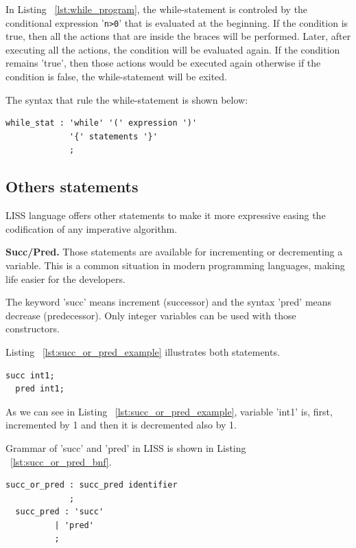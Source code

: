 \documentclass[
  oneside,
  11pt, a4paper,
  footinclude=true,
  headinclude=true,
  cleardoublepage=empty
]{scrbook}
\begin{document}
In Listing ~\ref{lst:while_program}, the while-statement is controled by the conditional expression '\verb+n>0+' that is evaluated at the beginning. If the condition is true, then all the actions that are inside the braces will be performed. Later, after executing all the actions, the condition will be evaluated again. If the condition remains 'true', then those actions would be executed again otherwise if the condition is false, the while-statement will be exited.

The syntax that rule the while-statement is shown below:

\begin{lstlisting}[caption={CFG for while-statement in LISS}]
  while_stat : 'while' '(' expression ')'
             '{' statements '}'
             ;
\end{lstlisting}



\subsection{Others statements}

LISS language offers other statements to make it more expressive easing the codification of any imperative algorithm.

\textbf{Succ/Pred.} Those statements are available for incrementing or decrementing a variable. This is a common situation in modern programming languages, making life easier for the developers. 

The keyword 'succ' means increment (successor) and the syntax 'pred' means decrease (predecessor). Only integer variables can be used with those constructors.

Listing ~\ref{lst:succ_or_pred_example} illustrates both statements.

\begin{lstlisting}[caption={Example of using succ/pred in LISS}, label={lst:succ_or_pred_example}]
  succ int1;
  pred int1;
\end{lstlisting}

As we can see in Listing ~\ref{lst:succ_or_pred_example}, variable 'int1' is, first, incremented by 1 and then it is decremented also by 1.

Grammar of 'succ' and 'pred' in LISS is shown in Listing ~\ref{lst:succ_or_pred_bnf}.


\begin{lstlisting}[caption={CFG for succ and pred in LISS}, label={lst:succ_or_pred_bnf}]
  succ_or_pred : succ_pred identifier
             ;
  succ_pred : 'succ'
          | 'pred'
          ;
\end{lstlisting}
\end{document}
